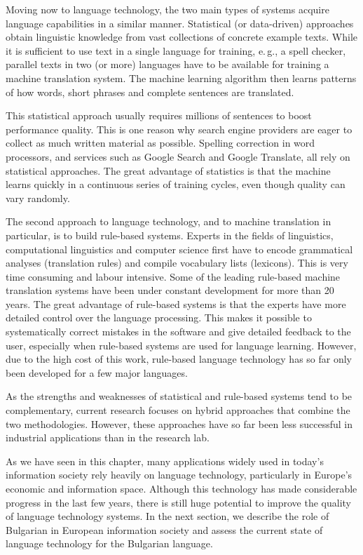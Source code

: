 \documentclass[]{../../metanetpaper}
\begin{document}
\begin{multicols}{2}
Moving now to language technology, the two main types of systems acquire language capabilities in a similar manner. Statistical (or data-driven) approaches obtain linguistic knowledge from vast collections of concrete example texts. While it is sufficient to use text in a single language for training, e.\,g., a spell checker, parallel texts in two (or more) languages have to be available for training a machine translation system. The machine learning algorithm then learns patterns of how words, short phrases and complete sentences are translated. 

This statistical approach usually requires millions of sentences to boost performance quality. This is one reason why search engine providers are eager to collect as much written material as possible. Spelling correction in word processors, and services such as Google Search and Google Translate, all rely on statistical approaches. The great advantage of statistics is that the machine learns quickly in a continuous series of training cycles, even though quality can vary randomly.

The second approach to language technology, and to machine translation in particular, is to build rule-based systems. Experts in the fields of linguistics, computational linguistics and computer science first have to encode grammatical analyses (translation rules) and compile vocabulary lists (lexicons). This is very time consuming and labour intensive. Some of the leading rule-based machine translation systems have been under constant development for more than 20 years. The great advantage of rule-based systems is that the experts have more detailed control over the language processing. This makes it possible to systematically correct mistakes in the software and give detailed feedback to the user, especially when rule-based systems are used for language learning. However, due to the high cost of this work, rule-based language technology has so far only been developed for a few major languages. 


As the strengths and weaknesses of statistical and rule-based systems tend to be complementary, current research focuses on hybrid approaches that combine the two methodologies. However, these approaches have so far been less successful in industrial applications than in the research lab. 

As we have seen in this chapter, many applications widely used in today’s information society rely heavily on language technology, particularly in Europe’s economic and information space. Although this technology has made considerable progress in the last few years, there is still huge potential to improve the quality of language technology systems. In the next section, we describe the role of Bulgarian in European information society and assess the current state of language technology for the Bulgarian language.
\end{multicols}
\end{document}
